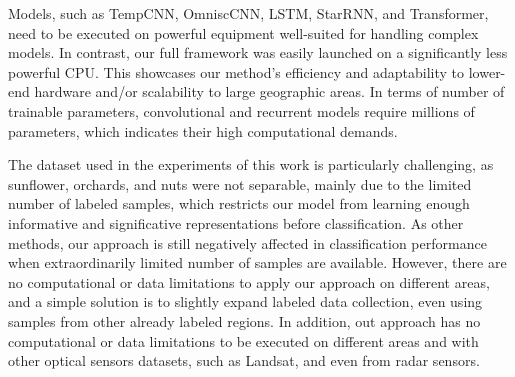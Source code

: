 \documentclass[journal,article,submit,pdftex,moreauthors]{Definitions/mdpi}
\begin{document}
Models, such as TempCNN, OmniscCNN, LSTM, StarRNN, and Transformer, need to be executed on powerful equipment well-suited for handling complex models. In contrast, our full framework was easily launched on a significantly less powerful CPU. This showcases our method's efficiency and adaptability to lower-end hardware and/or scalability to large geographic areas.
In terms of number of trainable parameters, convolutional and recurrent models require millions of parameters, which indicates their high computational demands. 



The dataset used in the experiments of this work is particularly challenging, as sunflower, orchards, and nuts were not separable, mainly due to the limited number of labeled samples, which restricts our model from learning enough informative and significative representations before classification.
As other methods, our approach is still negatively affected in classification performance when extraordinarily limited number of samples are available. However, there are no computational or data limitations to apply our approach on different areas, and a simple solution is to slightly expand labeled data collection, even using samples from other already labeled regions.
In addition, out approach has no computational or data limitations to be executed on different areas and with other optical sensors datasets, such as Landsat, and even from radar sensors.

\end{document}

